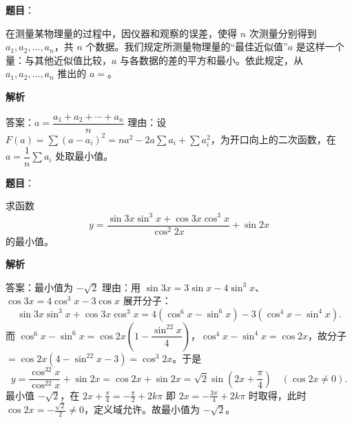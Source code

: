 \begin{answer}

\textbf{题目}：

在测量某物理量的过程中，因仪器和观察的误差，使得 $n$ 次测量分别得到 $a_1,a_2,\ldots,a_n$，共 $n$ 个数据。我们规定所测量物理量的“最佳近似值”$a$ 是这样一个量：与其他近似值比较，$a$ 与各数据的差的平方和最小。依此规定，从 $a_1,a_2,\ldots,a_n$ 推出的 $a=$\underline{\qquad\qquad}。

\textbf{解析}

答案：$a=\dfrac{a_1+a_2+\cdots+a_n}{n}$
理由：设 $F(a)=\sum(a-a_i)^2=na^2-2a\sum a_i+\sum a_i^2$，为开口向上的二次函数，在 $a=\dfrac1n\sum a_i$ 处取最小值。


\end{answer}
\begin{answer}

\textbf{题目}：

求函数
\nopagebreak[4]
\[
y=\frac{\sin3x\sin^3x+\cos3x\cos^3x}{\cos^2 2x}+\sin2x
\]
的最小值。

\textbf{解析}

答案：最小值为 $-\sqrt2$
理由：用 $\sin3x=3\sin x-4\sin^3x$、$\cos3x=4\cos^3x-3\cos x$ 展开分子：
\nopagebreak[4]
\[
\sin3x\sin^3x+\cos3x\cos^3x=4(\cos^6x-\sin^6x)-3(\cos^4x-\sin^4x).
\]
而 $\cos^6x-\sin^6x=\cos2x\left(1-\dfrac{\sin^22x}{4}\right)$，$\cos^4x-\sin^4x=\cos2x$，故分子 $=\cos2x\left(4-\sin^22x-3\right)=\cos^3 2x$。于是
\nopagebreak[4]
\[
y=\frac{\cos^32x}{\cos^22x}+\sin2x=\cos2x+\sin2x=\sqrt2\sin\left(2x+\frac\pi4\right)\quad(\cos2x\ne0).
\]
最小值 $-\sqrt2$，在 $2x+\frac\pi4=-\frac\pi2+2k\pi$ 即 $2x=-\frac{3\pi}{4}+2k\pi$ 时取得，此时 $\cos2x=-\frac{\sqrt2}{2}\ne0$，定义域允许。故最小值为 $-\sqrt2$。


\end{answer}
